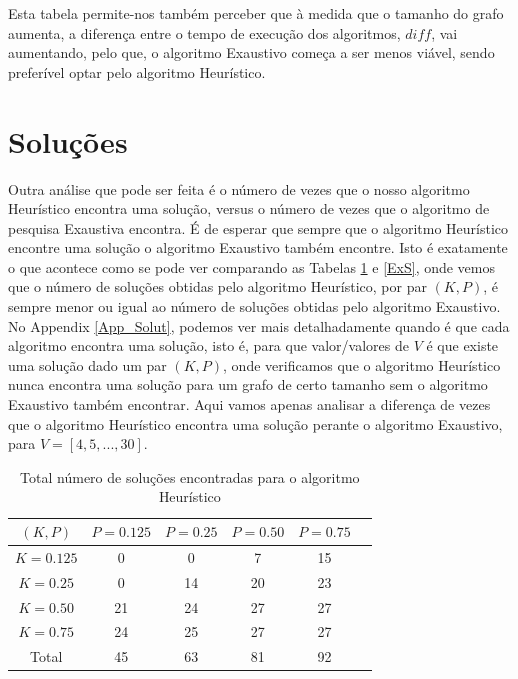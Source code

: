 \documentclass{revdetua}
\begin{document}
Esta tabela permite-nos também perceber que à medida que o tamanho do grafo aumenta, a diferença entre o tempo de execução dos algoritmos, $diff$, vai aumentando, pelo que, o algoritmo Exaustivo começa a ser menos viável, sendo preferível optar pelo algoritmo Heurístico.

\section{Soluções}

Outra análise que pode ser feita é o número de vezes que o nosso algoritmo Heurístico encontra uma solução, versus o número de vezes que o algoritmo de pesquisa Exaustiva encontra. É de esperar que sempre que o algoritmo Heurístico encontre uma solução o algoritmo Exaustivo também encontre. Isto é exatamente o que acontece como se pode ver comparando as Tabelas \ref{Heursi} e \ref{ExS}, onde vemos que o número de soluções obtidas pelo algoritmo Heurístico, por par $(K,P)$, é sempre menor ou igual ao número de soluções obtidas pelo algoritmo Exaustivo. No Appendix \ref{App_Solut}, podemos ver mais detalhadamente quando é que cada algoritmo encontra uma solução, isto é, para que valor/valores de $V$ é que existe uma solução dado um par $(K,P)$, onde verificamos que o algoritmo Heurístico nunca encontra uma solução para um grafo de certo tamanho sem o algoritmo Exaustivo também encontrar. 
Aqui vamos apenas analisar a diferença de vezes que o algoritmo Heurístico encontra uma solução perante o algoritmo Exaustivo, para $V = [4,5,...,30]$.

\begin{table}[h!]
\caption{Total número de soluções encontradas para o algoritmo Heurístico}
\label{Heursi}
\small
\centering
\begin{tabular}{|c|c|c|c|c|c|}
\hline
 $(K,P)$  & $P = 0.125$  & $P = 0.25$  & $P = 0.50$ & $P = 0.75$  \\ \hline
$K = 0.125$  & 0 & 0 & 7 & 15 \\ \hline
$K = 0.25$  & 0 & 14 & 20 & 23 \\ \hline
$K = 0.50$ & 21 & 24 &  27 & 27\\ \hline
$K = 0.75$  & 24 &  25 & 27 & 27\\ \hline
Total & 45 &  63 &  81 & 92 \\ \hline
\end{tabular}
\end{table}
\end{document}
